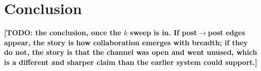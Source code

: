 \documentclass[sigconf,anonymous]{aamas}
\newcommand{\TODORESULT}[1]{\textbf{[TODO: #1]}}
\begin{document}
\section{Conclusion}

\TODORESULT{the conclusion, once the $k$ sweep is in. If post$\to$post edges
appear, the story is how collaboration emerges with breadth; if they do not,
the story is that the channel was open and went unused, which is a different
and sharper claim than the earlier system could support.}

\balance


\end{document}
